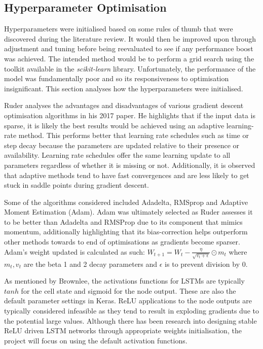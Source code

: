 \documentclass[10pt,onecolumn,letterpaper]{article}
\begin{document}
\subsection{Hyperparameter Optimisation} 

Hyperparameters were initialised based on some rules of thumb that were discovered during the literature review. It would then be improved upon through adjustment and tuning before being reevaluated to see if any performance boost was achieved. The intended method would be to perform a grid search using the toolkit available in the \textit{scikit-learn} library. Unfortunately, the performance of the model was fundamentally poor and so its responsiveness to optimisation insignificant. This section analyses how the hyperparameters were initialised. 

Ruder analyses the advantages and disadvantages of various gradient descent optimisation algorithms in his 2017 paper\cite{Ruder}. He highlights that if the input data is sparse, it is likely the best results would be achieved using an adaptive learning-rate method. This performs better that learning rate schedules such as time or step decay because the parameters are updated relative to their presence or availability. Learning rate schedules offer the same learning update to all parameters regardless of whether it is missing or not. Additionally, it is observed that adaptive methods tend to have fast convergences and are less likely to get stuck in saddle points during gradient descent. 

Some of the algorithms considered included Adadelta, RMSprop and Adaptive Moment Estimation (Adam). Adam\cite{Adam} was ultimately selected as Ruder assesses it to be better than Adadelta and RMSProp due to its component that mimics momentum, additionally highlighting that its bias-correction helps outperform other methods towards to end of optimisations as gradients become sparser. Adam's weight updated is calculated as such: $W_{t+1}=W_{t}-\frac{\eta}{\sqrt{v_{t}+\epsilon}}\odot m_{t}$ where $m_{t}, v_{t}$ are the beta 1 and 2 decay parameters and $\epsilon$ is to prevent division by 0.

As mentioned by Brownlee\cite{brownlee_activation}, the activations functions for LSTMs are typically $tanh$ for the cell state and sigmoid for the node output. These are also the default parameter settings in Keras. ReLU applications to the node outputs are typically considered infeasible as they tend to result in exploding gradients due to the potential large values. Although there has been research into designing stable ReLU driven LSTM networks through appropriate weights initialisation, the project will focus on using the default activation functions.    
\end{document}
